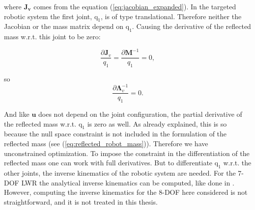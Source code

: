 where $\mathrm{\mathbf{J_v}}$ comes from the equation (\ref{eq:jacobian_expanded}). In the targeted robotic system the first joint, $\mathrm{q_1}$, is of type translational. Therefore neither  the Jacobian or the mass matrix depend on $\mathrm{q_1}$. Causing the derivative of the reflected mass w.r.t. this joint to be zero:


\begin{equation}
\frac{\partial {{\mathbf{J}_v}}}{q_1} = \frac{\partial {{\mathbf{M}^{-1}}}}{q_1} = 0,
\label{eq:j_m_no__q1}
\end{equation}


so 
\begin{equation}
\frac{\partial {{\mathbf{\Lambda}_{v}^{-1}}}}{q_1} = 0.
\end{equation}

And like $\mathbf{u}$ does not depend on the joint configuration, the partial derivative of the reflected mass w.r.t. $\mathrm{q_1}$ is zero as well.
As already explained, this is so because the null space constraint is not included in the formulation of the reflected mass (see  (\ref{eq:reflected_robot_mass})). Therefore we have  unconstrained optimization.  
To impose the constraint in the differentiation of the reflected mass one can work with full derivatives. But to differentiate $\mathrm{q_1}$ w.r.t. the other joints, the inverse kinematics of the robotic system are needed. For the 7-DOF LWR the analytical inverse kinematics can be computed, like done in \cite{analyticalInverseKinematicComputation}. However, computing the inverse kinematics for the 8-DOF here considered is not straightforward, and it is not treated in this thesis.










